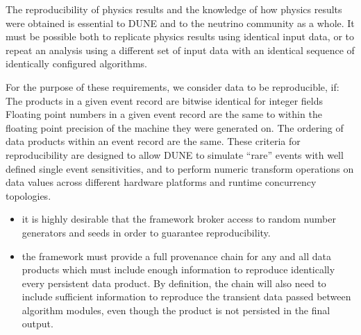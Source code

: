 \documentclass[../main-v1.tex]{subfiles}
\begin{document}
The reproducibility of physics results and the knowledge of how physics results were obtained is essential to DUNE and to the neutrino community as a whole.  It must be possible both to replicate physics results using identical input data, or to repeat an analysis using a different set of input data with an identical sequence of identically configured algorithms. 


 For the purpose of these requirements, we consider data to be reproducible, if:
The products in a given event record are bitwise identical for integer fields
Floating point numbers in a given event record are the same to within the floating point precision of the machine they were generated on.
The ordering of data products within an event record are the same.
These criteria for reproducibility are designed to allow DUNE to simulate “rare” events with well defined single event sensitivities, and to perform numeric transform operations on data values across different hardware platforms and runtime concurrency topologies.
\begin{itemize}


\item it is highly desirable that the framework broker access to random number generators and seeds in order to guarantee reproducibility.  


\item the framework must provide a full provenance chain for any and all data products which must include enough information to reproduce identically every persistent data product.  By definition, the chain will also need to include sufficient information to reproduce the transient data passed between algorithm modules, even though the product is not persisted in the final output.  
\end{itemize}
\end{document}

